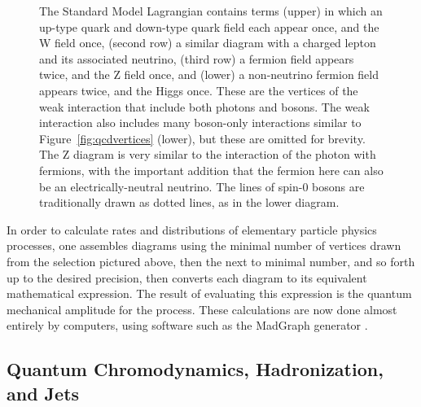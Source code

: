 \begin{figure}[h!]
    \caption[The vertices of QCD.]{
      The Standard Model Lagrangian contains terms (upper) in which an up-type quark and down-type quark field each appear once, and the W field once, (second row) a similar diagram with a charged lepton and its associated neutrino, (third row) a fermion field appears twice, and the Z field once, and (lower) a non-neutrino fermion field appears twice, and the Higgs once.
      These are the vertices of the weak interaction that include both photons and bosons.      
      The weak interaction also includes many boson-only interactions similar to Figure~\ref{fig:qcdvertices} (lower), but these are omitted for brevity.
      The Z diagram is very similar to the interaction of the photon with fermions, with the important addition that the fermion here can also be an electrically-neutral neutrino.
      The lines of spin-0 bosons are traditionally drawn as dotted lines, as in the lower diagram.
    }
    \label{fig:weakvertices}
  \end{figure}  

  In order to calculate rates and distributions of elementary particle physics processes, one assembles diagrams using the minimal number of vertices drawn from the selection pictured above, then the next to minimal number, and so forth up to the desired precision, then converts each diagram to its equivalent mathematical expression.
  The result of evaluating this expression is the quantum mechanical amplitude for the process.
  These calculations are now done almost entirely by computers, using software such as the MadGraph generator \cite{madgraph}.

  \subsection{Quantum Chromodynamics, Hadronization, and Jets} \label{sec:hadronization}

